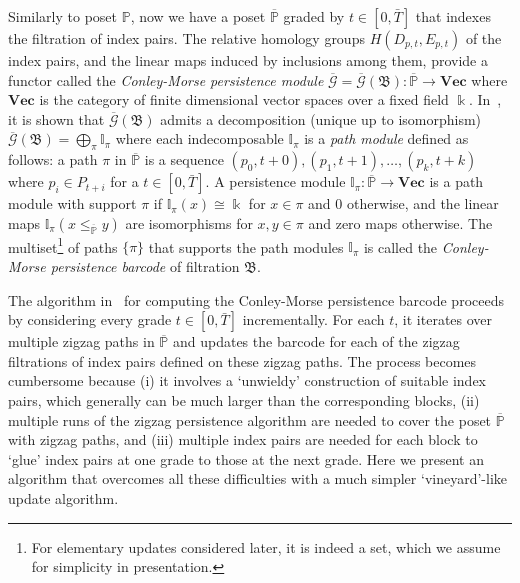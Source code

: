 \documentclass[letterpaper,11pt]{article}
\theoremstyle{plain}
\theoremstyle{definition}
\newcounter{li}
\newcommand{\zzBD}{\mathfrak{B}}
\newcommand{\VecSp}{\mathbf{Vec}}
\newcommand{\field}{\Bbbk}
\newcommand\todo[1]{\textcolor{red}{[TODO: #1]}}
\begin{document}
Similarly to poset $\mathbb{P}$, now we have a poset $\overline{\mathbb{P}}$ graded by
$t\in [0,\bar{T}]$ that indexes the filtration of index pairs. The relative homology groups $H(D_{p,t},E_{p,t})$ of the index pairs, and the linear maps
induced by inclusions among them, provide a functor called the \emph{Conley-Morse persistence module}
$\overline{\mathcal G}=\overline{\mathcal G}(\zzBD):\overline{\mathbb{P}}\rightarrow \VecSp$ where $\VecSp$ is
the category of finite dimensional vector spaces over a fixed field $\field$. 
In~\cite{CMbarcodes2025}, it is shown  that 
$\overline{\mathcal G}(\zzBD)$ admits a decomposition (unique up to isomorphism)
$\overline{\mathcal G}(\zzBD)= \bigoplus_\pi \mathbb{I}_\pi$ where
each indecomposable $\mathbb{I}_\pi$ is a \emph{path module} defined as follows:
    a path $\pi$ in $\overline{\mathbb {P}}$ is a sequence $(p_0,t+0),(p_1,t+1),\ldots, (p_k,t+k)$ where
$p_i\in P_{t+i}$ for a $t\in [0,\bar T]$. A persistence module $ \mathbb{I}_\pi:\overline{\mathbb{P}}\rightarrow \VecSp$ is a path module with support
$\pi$ if 
$\mathbb{I}_\pi(x)\cong \Bbbk$ for
$x\in \pi$ and $0$ otherwise, and
the linear maps $\mathbb{I}_\pi(x\leq_{\overline{\mathbb{P}}} y)$ are
isomorphisms for $x,y\in \pi$ and zero maps otherwise.
The multiset\footnote{For elementary updates considered later, it is indeed a set, which we assume for simplicity in presentation.} of 
paths $\{\pi\}$ that supports the
path modules $\mathbb{I}_{\pi}$ %
is called the \emph{Conley-Morse persistence barcode} of filtration $\zzBD$.


The algorithm in~\cite{CMbarcodes2025} for computing the Conley-Morse persistence barcode proceeds
by considering every grade $t\in [0,\bar T]$ incrementally.
For each $t$, it 
iterates over multiple zigzag paths in $\overline{\mathbb{P}}$
and updates the barcode for each of the zigzag filtrations of index pairs
defined on these zigzag paths. 
The process becomes cumbersome because (i) it involves a `unwieldy' construction
of suitable index pairs, which generally
can be much larger than the corresponding blocks, (ii) multiple runs of the zigzag persistence 
algorithm are needed to cover the poset $\overline{\mathbb P}$ with zigzag paths, and
(iii) multiple index pairs are needed for each block to `glue'
index pairs at one grade to those at the next grade. 
Here we present an algorithm that overcomes all
these difficulties with a much simpler `vineyard'-like update algorithm.
\end{document}
